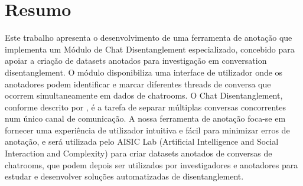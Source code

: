 \chapter*{Resumo}

Este trabalho apresenta o desenvolvimento de uma ferramenta de anotação que implementa um Módulo de Chat Disentanglement especializado, concebido para apoiar a criação de datasets anotados para investigação em conversation disentanglement. O módulo disponibiliza uma interface de utilizador onde os anotadores podem identificar e marcar diferentes threads de conversa que ocorrem simultaneamente em dados de chatrooms. O Chat Disentanglement, conforme descrito por \textcite{elsner2010disentangling}, é a tarefa de separar múltiplas conversas concorrentes num único canal de comunicação. A nossa ferramenta de anotação foca-se em fornecer uma experiência de utilizador intuitiva e fácil para minimizar erros de anotação, e será utilizada pelo AISIC Lab (Artificial Intelligence and Social Interaction and Complexity) para criar datasets anotados de conversas de chatrooms, que podem depois ser utilizados por investigadores e anotadores para estudar e desenvolver soluções automatizadas de disentanglement.

